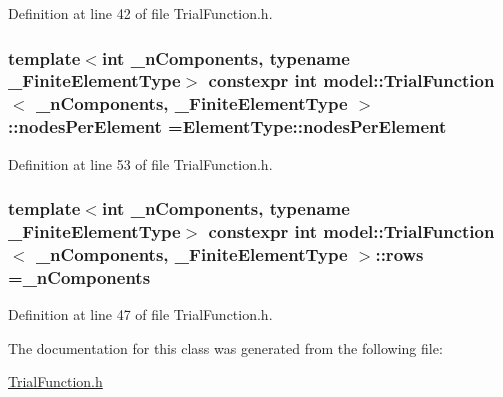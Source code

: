 Definition at line 42 of file Trial\+Function.\+h.

\hypertarget{classmodel_1_1_trial_function_a88ce10c7d07ae2ce3d8f3c7342f55c26}{}
\subsubsection[{nodes\+Per\+Element}]{\setlength{\rightskip}{0pt plus 5cm}template$<$int \+\_\+n\+Components, typename \+\_\+\+Finite\+Element\+Type$>$ constexpr int {\bf model\+::\+Trial\+Function}$<$ \+\_\+n\+Components, \+\_\+\+Finite\+Element\+Type $>$\+::nodes\+Per\+Element =Element\+Type\+::nodes\+Per\+Element\hspace{0.3cm}{\ttfamily [static]}}\label{classmodel_1_1_trial_function_a88ce10c7d07ae2ce3d8f3c7342f55c26}


Definition at line 53 of file Trial\+Function.\+h.

\hypertarget{classmodel_1_1_trial_function_a1d4b756e358d5dbf7cc9464bc6bb37a8}{}
\subsubsection[{rows}]{\setlength{\rightskip}{0pt plus 5cm}template$<$int \+\_\+n\+Components, typename \+\_\+\+Finite\+Element\+Type$>$ constexpr int {\bf model\+::\+Trial\+Function}$<$ \+\_\+n\+Components, \+\_\+\+Finite\+Element\+Type $>$\+::rows =\+\_\+n\+Components\hspace{0.3cm}{\ttfamily [static]}}\label{classmodel_1_1_trial_function_a1d4b756e358d5dbf7cc9464bc6bb37a8}


Definition at line 47 of file Trial\+Function.\+h.



The documentation for this class was generated from the following file\+:\begin{DoxyCompactItemize}
\item 
\hyperlink{_trial_function_8h}{Trial\+Function.\+h}\end{DoxyCompactItemize}

